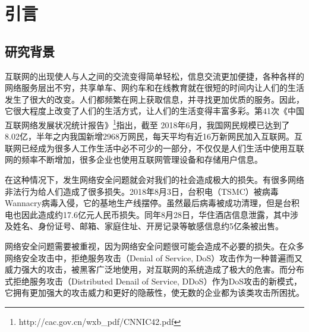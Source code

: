 \chapter{引言}
\label{cha:intro}

\section{研究背景}
\label{sec:background}

互联网的出现使人与人之间的交流变得简单轻松，信息交流更加便捷，各种各样的网络服务层出不穷，共享单车、网约车和在线教育就在很短的时间内让人们的生活发生了很大的改变。人们都频繁在网上获取信息，并寻找更加优质的服务。因此，它很大程度上改变了人们的生活方式，让人们的生活变得丰富多彩。第41次《中国互联网络发展状况统计报告》\footnote{http://cac.gov.cn/wxb\_pdf/CNNIC42.pdf}指出，截至 2018年6月，我国网民规模已达到了8.02亿，半年之内我国新增2968万网民，每天平均有近16万新网民加入互联网。互联网已经成为很多人工作生活中必不可少的一部分，不仅仅是人们生活中使用互联网的频率不断增加，很多企业也使用互联网管理设备和存储用户信息。

在这种情况下，发生网络安全问题就会对我们的社会造成极大的损失。有很多网络非法行为给人们造成了很多损失。2018年8月3日，台积电（TSMC）被病毒Wannacry病毒入侵，它的基地生产线摆停。虽然最后病毒被成功清理，但是台积电也因此造成约17.6亿元人民币损失。同年8月28日，华住酒店信息泄露，其中涉及姓名、身份证号、邮箱、家庭住址、开房记录等敏感信息约5亿条被出售。

网络安全问题需要被重视，因为网络安全问题很可能会造成不必要的损失。在众多网络安全攻击中，拒绝服务攻击（Denial of Service, DoS）攻击作为一种普遍而又威力强大的攻击，被黑客广泛地使用，对互联网的系统造成了极大的危害。而分布式拒绝服务攻击（Distributed Denail of Service, DDoS）作为DoS攻击的新模式，它拥有更加强大的攻击威力和更好的隐蔽性，使无数的企业都为该类攻击所困扰。


